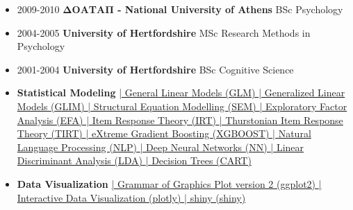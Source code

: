 \documentclass[
]{article}
\begin{document}
\begin{tcolorbox}[colframe=gray!75!black,colback=gray!10!white,left=0pt,sharp corners,title=Education]
\begin{itemize}[leftmargin=*,label={--},itemsep=0em]\item
2009-2010
\textbf{ ΔΟΑΤΑΠ - National University of Athens }
BSc Psychology 
\item
2004-2005
\textbf{ University of Hertfordshire }
MSc Research Methods in Psychology 
\item
2001-2004
\textbf{ University of Hertfordshire }
BSc Cognitive Science 
\end{itemize}
\end{tcolorbox}

\begin{tcolorbox}[colframe=gray!75!black,colback=gray!10!white,left=0pt,sharp corners,title=Skills (point and click bellow to see examples)]
\begin{itemize}[leftmargin=*,label={--},itemsep=0em]\item\textbf{ Statistical Modeling } 
\newline\hspace{2em}\href{ https://rpubs.com/sedzinfo/glm_anova }{| General Linear Models (GLM)  }
\href{ https://rpubs.com/sedzinfo/400840 }{| Generalized Linear Models (GLIM)  }
\href{ https://rpubs.com/sedzinfo/cfa_mi }{| Structural Equation Modelling (SEM)  }
\href{ https://rpubs.com/sedzinfo/glm_efa }{| Exploratory Factor Analysis (EFA)  }
\href{ https://dimitrios.shinyapps.io/modelsirt/ }{| Item Response Theory (IRT)  }
\href{ https://rpubs.com/sedzinfo/tirt }{| Thurstonian Item Response Theory (TIRT)  }
\href{ https://rpubs.com/sedzinfo/functions_train_test }{| eXtreme Gradient Boosting (XGBOOST)  }
\href{ https://rpubs.com/sedzinfo/nlp }{| Natural Language Processing (NLP)  }
\href{ https://rpubs.com/sedzinfo/keras_mnist }{| Deep Neural Networks (NN)  }
\href{ https://rpubs.com/sedzinfo/lda }{| Linear Discriminant Analysis (LDA)  }
\href{ https://rpubs.com/sedzinfo/rpart }{| Decision Trees (CART)  }
\item\textbf{ Data Visualization } 
\newline\hspace{2em}\href{ https://github.com/sedzinfo/snp }{| Grammar of Graphics Plot version 2 (ggplot2)  }
\href{ https://rpubs.com/sedzinfo/covid_deaths_infection }{| Interactive Data Visualization (plotly)  }
\href{ https://dimitrios.shinyapps.io/worldbank/ }{| shiny (shiny)  }
\end{itemize}
\end{tcolorbox}
\end{document}
